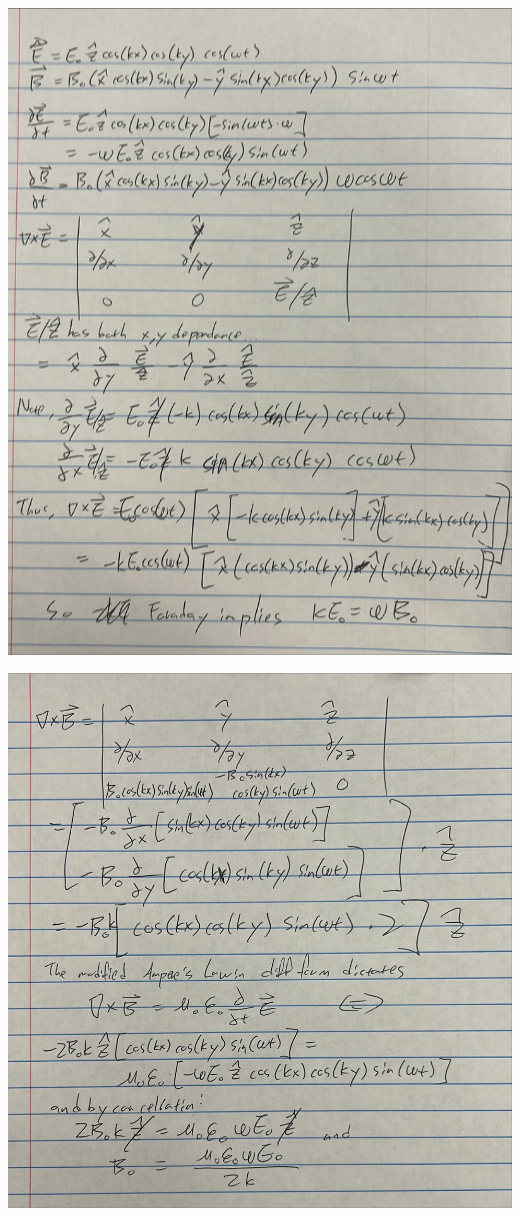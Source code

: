 \documentclass{article}
\begin{document}
\includegraphics[width = \linewidth]{Q923-1.png}

\includegraphics[width = \linewidth]{Q923-2.png}
\newpage
\end{document}
